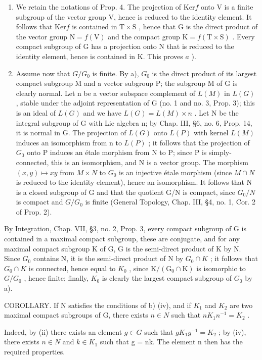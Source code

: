 \begin{enumerate}
\def\labelenumi{\alph{enumi})}
\item
  We retain the notations of Prop. 4. The projection of \(\mathrm{Ker}f\) onto V is a finite subgroup of the vector group V, hence is reduced to the identity element. It follows that \(\mathrm{Ker}f\) is contained in \(\mathrm{T} \times \mathrm{S}\) , hence that G is the direct product of the vector group \(\mathrm{N} = f(\mathrm{V})\) and the compact group \(\mathrm{K} = f(\mathrm{T} \times \mathrm{S})\) . Every compact subgroup of G has a projection onto N that is reduced to the identity element, hence is contained in K. This proves \(a\) ).
\item
  Assume now that \(G/G_{0}\) is finite. By a), \(G_{0}\) is the direct product of its largest compact subgroup M and a vector subgroup P; the subgroup M of G is clearly normal. Let n be a vector subspace complement of \(L(M)\) in \(L(G)\) , stable under the adjoint representation of G (no. 1 and no. 3, Prop. 3); this is an ideal of \(L(G)\) and we have \(L(G) = L(M) \times n\) . Let N be the integral subgroup of G with Lie algebra n; by Chap. III, §6, no. 6, Prop. 14, it is normal in G. The projection of \(L(G)\) onto \(L(P)\) with kernel \(L(M)\) induces an isomorphism from n to \(L(P)\) ; it follows that the projection of \(G_{0}\) onto P induces an étale morphism from N to P; since P is simply-connected, this is an isomorphism, and N is a vector group. The morphism \((x, y) \mapsto xy\) from \(M \times N\) to \(G_{0}\) is an injective étale morphism (since \(M \cap N\) is reduced to the identity element), hence an isomorphism. It follows that N is a closed subgroup of G and that the quotient G/N is compact, since \(G_{0}/N\) is compact and \(G/G_{0}\) is finite (General Topology, Chap. III, §4, no. 1, Cor. 2 of Prop. 2).
\end{enumerate}

By Integration, Chap. VII, §3, no. 2, Prop. 3, every compact subgroup of G is contained in a maximal compact subgroup, these are conjugate, and for any maximal compact subgroup K of G, G is the semi-direct product of K by N. Since \(G_{0}\) contains N, it is the semi-direct product of N by \(G_{0} \cap K\) ; it follows that \(G_{0} \cap K\) is connected, hence equal to \(K_{0}\) , since \(\mathrm{K}/(\mathrm{G}_{0} \cap \mathrm{K})\) is isomorphic to \(G/G_{0}\) , hence finite; finally, \(K_{0}\) is clearly the largest compact subgroup of \(G_{0}\) by a).

COROLLARY. If N satisfies the conditions of b) (iv), and if \(K_{1}\) and \(K_{2}\) are two maximal compact subgroups of G, there exists \(n \in N\) such that \(nK_{1}n^{-1} = K_{2}\) .

Indeed, by (ii) there exists an element \(g \in G\) such that \(gK_{1}g^{-1} = K_{2}\) ; by (iv), there exists \(n \in N\) and \(k \in K_{1}\) such that g = nk. The element n then has the required properties.

